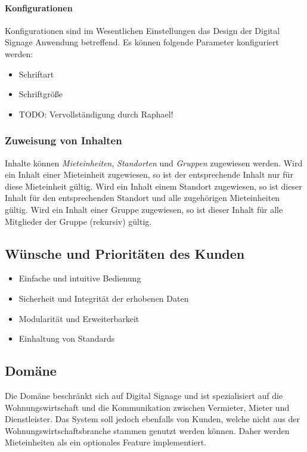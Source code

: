 \documentclass[a4paper]{article}
\begin{document}
	\paragraph{Konfigurationen}
	Konfigurationen sind im Wesentlichen Einstellungen das Design der Digital Signage Anwendung betreffend.
	Es können folgende Parameter konfiguriert werden:
	\begin{itemize}
	\item Schriftart
	\item Schriftgröße
	\item TODO: Vervollständigung durch Raphael!
	\end{itemize}
	\subsubsection{Zuweisung von Inhalten}
	Inhalte können \emph{Mieteinheiten}, \emph{Standorten} und \emph{Gruppen} zugewiesen werden.
	Wird ein Inhalt einer Mieteinheit zugewiesen, so ist der entsprechende Inhalt nur für diese Mieteinheit gültig. Wird ein Inhalt einem Standort zugewiesen, so ist dieser Inhalt für den entsprechenden Standort und alle zugehörigen Mieteinheiten gültig. Wird ein Inhalt einer Gruppe zugewiesen, so ist dieser Inhalt für alle Mitglieder der Gruppe (rekursiv) gültig.
	\subsection{Wünsche und Prioritäten des Kunden}
	\begin{itemize}
		\item Einfache und intuitive Bedienung
		\item Sicherheit und Integrität der erhobenen Daten
		\item Modularität und Erweiterbarkeit
		\item Einhaltung von Standards
	\end{itemize}
		
	\subsection{Domäne}
	Die Domäne beschränkt sich auf Digital Signage und ist spezialisiert auf die Wohnungswirtschaft und die Kommunikation zwischen Vermieter, Mieter und Dienstleister.
	Das System soll jedoch ebenfalls von Kunden, welche nicht aus der Wohnungswirtschaftsbranche stammen genutzt werden können. Daher werden Mieteinheiten als ein optionales Feature implementiert.
\end{document}
